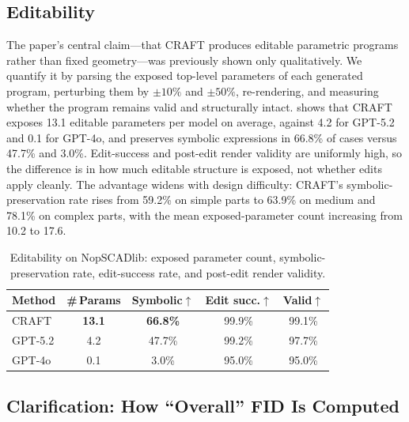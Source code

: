 \subsection{Editability}
\label{subsec:edit}

The paper's central claim---that CRAFT produces editable parametric programs rather than fixed geometry---was previously shown only qualitatively. We quantify it by parsing the exposed top-level parameters of each generated program, perturbing them by $\pm10\%$ and $\pm50\%$, re-rendering, and measuring whether the program remains valid and structurally intact.  shows that CRAFT exposes 13.1 editable parameters per model on average, against 4.2 for GPT-5.2 and 0.1 for GPT-4o, and preserves symbolic expressions in 66.8\% of cases versus 47.7\% and 3.0\%. Edit-success and post-edit render validity are uniformly high, so the difference is in how much editable structure is exposed, not whether edits apply cleanly. The advantage widens with design difficulty: CRAFT's symbolic-preservation rate rises from 59.2\% on simple parts to 63.9\% on medium and 78.1\% on complex parts, with the mean exposed-parameter count increasing from 10.2 to 17.6.

\begin{table}[t]
\centering
\caption{Editability on NopSCADlib: exposed parameter count, symbolic-preservation rate, edit-success rate, and post-edit render validity.}
\label{tab:edit-r}
\small
\setlength{\tabcolsep}{5pt}
\begin{tabular}{lcccc}
\toprule
Method & \#\,Params & Symbolic$\uparrow$ & Edit succ.$\uparrow$ & Valid$\uparrow$ \\
\midrule
CRAFT   & \textbf{13.1} & \textbf{66.8\%} & 99.9\% & 99.1\% \\
GPT-5.2 & 4.2  & 47.7\% & 99.2\% & 97.7\% \\
GPT-4o  & 0.1  & 3.0\%  & 95.0\% & 95.0\% \\
\bottomrule
\end{tabular}
\end{table}

\subsection{Clarification: How ``Overall'' FID Is Computed}
\label{subsec:fid}

